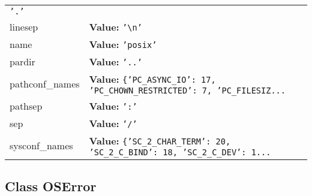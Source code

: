 \begin{longtable}{|p{\varnamewidth}|p{\vardescrwidth}|l}
{\tt \texttt{'}\texttt{.}\texttt{'}}&\\
\cline{1-2}
\raggedright l\-i\-n\-e\-s\-e\-p\- & \raggedright \textbf{Value:} 
{\tt \texttt{'}\texttt{{\textbackslash}n}\texttt{'}}&\\
\cline{1-2}
\raggedright n\-a\-m\-e\- & \raggedright \textbf{Value:} 
{\tt \texttt{'}\texttt{posix}\texttt{'}}&\\
\cline{1-2}
\raggedright p\-a\-r\-d\-i\-r\- & \raggedright \textbf{Value:} 
{\tt \texttt{'}\texttt{..}\texttt{'}}&\\
\cline{1-2}
\raggedright p\-a\-t\-h\-c\-o\-n\-f\-\_\-n\-a\-m\-e\-s\- & \raggedright \textbf{Value:} 
{\tt \texttt{\{}\texttt{'}\texttt{PC\_ASYNC\_IO}\texttt{'}\texttt{: }17\texttt{, }\texttt{'}\texttt{PC\_CHOWN\_RESTRICTED}\texttt{'}\texttt{: }7\texttt{, }\texttt{'}\texttt{PC\_FILESIZ}\texttt{...}}&\\
\cline{1-2}
\raggedright p\-a\-t\-h\-s\-e\-p\- & \raggedright \textbf{Value:} 
{\tt \texttt{'}\texttt{:}\texttt{'}}&\\
\cline{1-2}
\raggedright s\-e\-p\- & \raggedright \textbf{Value:} 
{\tt \texttt{'}\texttt{/}\texttt{'}}&\\
\cline{1-2}
\raggedright s\-y\-s\-c\-o\-n\-f\-\_\-n\-a\-m\-e\-s\- & \raggedright \textbf{Value:} 
{\tt \texttt{\{}\texttt{'}\texttt{SC\_2\_CHAR\_TERM}\texttt{'}\texttt{: }20\texttt{, }\texttt{'}\texttt{SC\_2\_C\_BIND}\texttt{'}\texttt{: }18\texttt{, }\texttt{'}\texttt{SC\_2\_C\_DEV}\texttt{'}\texttt{: }1\texttt{...}}&\\
\cline{1-2}
\end{longtable}



\subsection{Class OSError}

